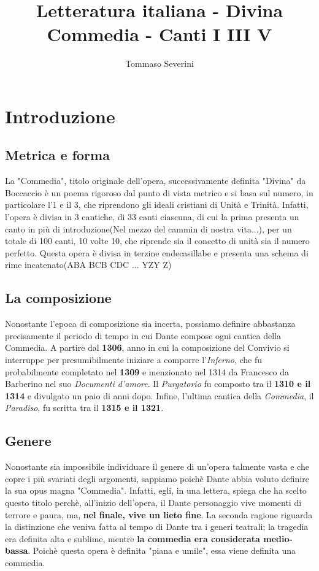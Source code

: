 \documentclass[10pt,a4paper]{article}
\author{Tommaso Severini}
\title{Letteratura italiana - Divina Commedia - Canti I III V}
\begin{document}
	\maketitle
	
	\section{Introduzione}
	
	\subsection{Metrica e forma}
	
	La "Commedia", titolo originale dell'opera, successivamente definita "Divina" da Boccaccio è un poema rigoroso dal punto di vista metrico e si basa sul numero, in particolare l'1 e il 3, che riprendono gli ideali cristiani di Unità e Trinità. Infatti, l'opera è divisa in 3 cantiche, di 33 canti ciascuna, di cui la prima presenta un canto in più di introduzione(Nel mezzo del cammin di nostra vita...), per un totale di 100 canti, 10 volte 10, che riprende sia il concetto di unità sia il numero perfetto. Questa opera è divisa in terzine endecasillabe e presenta una schema di rime incatenato(ABA BCB CDC ... YZY Z) 
	
	\subsection{La composizione}
	
	Nonostante l'epoca di composizione sia incerta, possiamo definire abbastanza precisamente il periodo di tempo in cui Dante compose ogni cantica della Commedia. A partire dal \textbf{1306}, anno in cui la composizione del Convivio si interruppe per presumibilmente iniziare a comporre l'\textit{Inferno}, che fu probabilmente completato nel \textbf{1309} e menzionato nel 1314 da Francesco da Barberino nel suo \textit{Documenti d'amore}. Il \textit{Purgatorio} fu composto tra il \textbf{1310 e il 1314} e divulgato un paio di anni dopo. Infine, l'ultima cantica della \textit{Commedia}, il \textit{Paradiso}, fu scritta tra il \textbf{1315 e il 1321}.
	
	\subsection{Genere}
	
	Nonostante sia impossibile individuare il genere di un'opera talmente vasta e che copre i più svariati degli argomenti, sappiamo poichè Dante abbia voluto definire la sua opus magna "Commedia". Infatti, egli, in una lettera, spiega che ha scelto questo titolo perchè, all'inizio dell'opera, il Dante personaggio vive momenti di terrore e paura, ma, \textbf{nel finale, vive un lieto fine}. La seconda ragione riguarda la distinzione che veniva fatta al tempo di Dante tra i generi teatrali; la tragedia era definita alta e sublime, mentre \textbf{la commedia era considerata medio-bassa}. Poichè questa opera è definita "piana e umile", essa viene definita una commedia.
	
\end{document}
